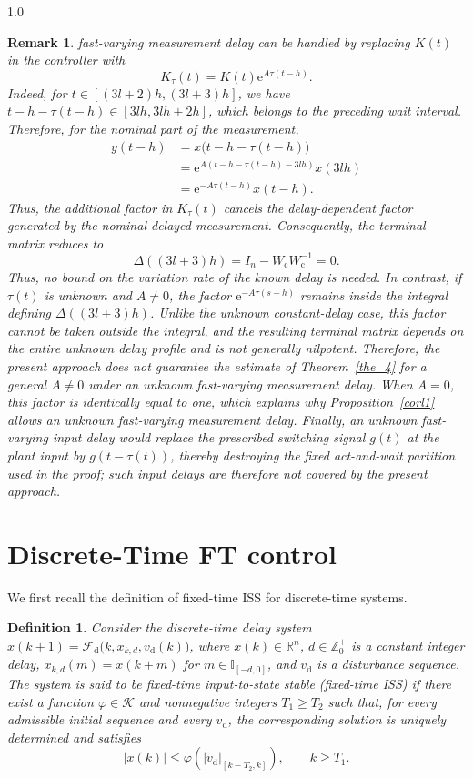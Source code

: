 \documentclass[journal]{IEEEtran}
\newtheorem{remark}{Remark}
\newtheorem{definition}{Definition}
\begin{document}
\begin{spacing}{1.0}
\begin{remark}
fast-varying measurement delay can be handled by replacing $K(t)$ in the
controller with
\[
K_{\tau}(t)=K(t)\mathrm{e}^{A\tau(t-h)}.
\]
Indeed, for
$t\in[(3l+2)h,(3l+3)h]$, we have
$t-h-\tau(t-h)\in[3lh,3lh+2h]$,
which belongs to the preceding wait interval. Therefore, for the nominal
part of the measurement,
\[
\begin{aligned}
y(t-h)
&=x\bigl(t-h-\tau(t-h)\bigr)\\
&=\mathrm{e}^{A(t-h-\tau(t-h)-3lh)}x(3lh)\\
&=\mathrm{e}^{-A\tau(t-h)}x(t-h).
\end{aligned}
\]
Thus, the additional factor in $K_{\tau}(t)$ cancels the
delay-dependent factor generated by the nominal delayed measurement. Consequently, the terminal matrix reduces to
\[
\mathit{\Delta}((3l+3)h)
=I_n-W_{\mathrm{c}}W_{\mathrm{c}}^{-1}=0.
\]
Thus, no bound on the variation rate of the known delay is needed. In
contrast, if $\tau(t)$ is unknown and $A\neq0$, the factor
$\mathrm{e}^{-A\tau(s-h)}$ remains inside the integral defining
$\mathit{\Delta}((3l+3)h)$. Unlike the unknown constant-delay case, this
factor cannot be taken outside the integral, and the resulting terminal
matrix depends on the entire unknown delay profile and is not generally
nilpotent. Therefore, the present approach does not guarantee the estimate
of Theorem~\ref{the_4} for a general $A\neq0$ under an unknown fast-varying
measurement delay. When $A=0$, this factor is identically equal to one,
which explains why Proposition~\ref{corl1} allows an unknown fast-varying
measurement delay. Finally, an unknown fast-varying input delay would
replace the prescribed switching signal $g(t)$ at the plant input by
$g(t-\tau(t))$, thereby destroying the fixed act-and-wait partition
used in the proof; such input delays are therefore not covered by the
present approach.
\end{remark}
\section{\label{sec3}Discrete-Time FT control}
We first recall the definition of fixed-time ISS for discrete-time systems.
\begin{definition}
\label{def_discrete_ftiss}
\cite{Mazenc24css} Consider the discrete-time delay system
$x(k+1)=\mathcal{F}_{\mathrm d}
\bigl(k,x_{k,d},v_{\mathrm d}(k)\bigr)$,
where $x(k)\in\mathbb{R}^{n}$, $d\in\mathbb{Z}_{0}^{+}$ is a constant
integer delay,
$x_{k,d}(m)=x(k+m)$ for $m\in\mathbb{I}_{[-d,0]}$, and
$v_{\mathrm d}$ is a disturbance sequence. The system is said to be
fixed-time input-to-state stable (fixed-time ISS) if there exist a function
$\varphi\in\mathcal{K}$ and nonnegative integers $T_{1}\geq T_{2}$ such
that, for every admissible initial sequence and every $v_{\mathrm d}$, the
corresponding solution is uniquely determined and satisfies
\[
|x(k)|
\leq
\varphi\left(
|v_{\mathrm d}|_{[k-T_{2},k]}
\right),
\qquad k\geq T_{1}.
\]
\end{definition}

\end{spacing}
\end{document}
